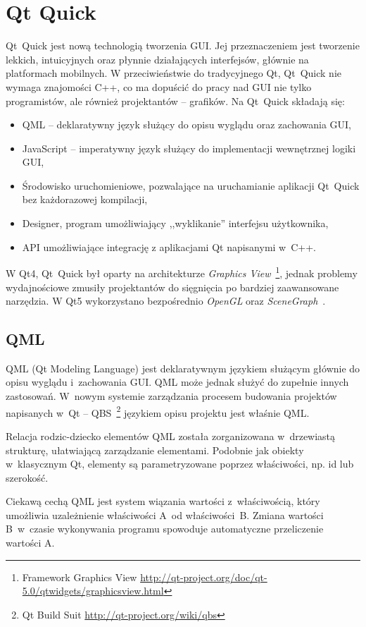 \section{Qt Quick}
Qt~Quick jest nową technologią tworzenia GUI. Jej przeznaczeniem jest tworzenie lekkich, intuicyjnych oraz płynnie działających interfejsów, głównie na platformach mobilnych. W przeciwieństwie do tradycyjnego Qt, Qt~Quick nie wymaga znajomości C++, co ma dopuścić do pracy nad GUI nie tylko programistów, ale również projektantów -- grafików.
Na Qt~Quick składają się:
\begin{itemize}
\item QML -- deklaratywny język służący do opisu wyglądu oraz zachowania GUI,
\item JavaScript -- imperatywny język służący do implementacji wewnętrznej logiki GUI,
\item Środowisko uruchomieniowe, pozwalające na uruchamianie aplikacji Qt~Quick bez każdorazowej kompilacji,
\item Designer, program umożliwiający ,,wyklikanie'' interfejsu użytkownika,
\item API umożliwiające integrację z aplikacjami Qt napisanymi w~C++.
\end{itemize}

W Qt4, Qt~Quick był oparty na architekturze \textit{Graphics View}~\footnote{Framework Graphics View  \url{http://qt-project.org/doc/qt-5.0/qtwidgets/graphicsview.html}}, jednak problemy wydajnościowe zmusiły projektantów do sięgnięcia po bardziej zaawansowane narzędzia. W Qt5 wykorzystano bezpośrednio \textit{OpenGL} oraz \textit{SceneGraph}~\cite{Scene:Graph}.

\subsection{QML}
QML (Qt Modeling Language) jest deklaratywnym językiem służącym głównie do opisu wyglądu i~zachowania GUI. QML może jednak służyć do zupełnie innych zastosowań. W~nowym systemie zarządzania procesem budowania projektów napisanych w~Qt -- QBS~\footnote{Qt Build Suit \url{http://qt-project.org/wiki/qbs}} językiem opisu projektu jest właśnie QML.

Relacja rodzic-dziecko elementów QML została zorganizowana w~drzewiastą strukturę, ułatwiającą zarządzanie elementami. Podobnie jak obiekty w~klasycznym Qt, elementy są parametryzowane poprzez  właściwości, np. id lub szerokość. 

Ciekawą cechą QML jest system wiązania wartości z~właściwością, który umożliwia uzależnienie właściwości A~od właściwości~B. Zmiana wartości B~w~czasie wykonywania programu spowoduje automatyczne przeliczenie wartości A.

